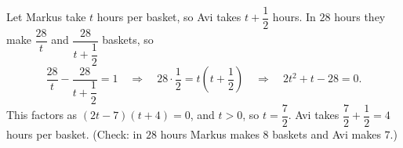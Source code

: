 Let Markus take $t$ hours per basket, so Avi takes $t+\dfrac{1}{2}$ hours. In $28$ hours they make $\dfrac{28}{t}$ and $\dfrac{28}{t+\dfrac{1}{2}}$ baskets, so
\[
\dfrac{28}{t}-\dfrac{28}{t+\dfrac{1}{2}}=1\quad\Longrightarrow\quad 28\cdot\dfrac{1}{2}=t\left(t+\dfrac{1}{2}\right)\quad\Longrightarrow\quad 2t^2+t-28=0 .
\]
This factors as $(2t-7)(t+4)=0$, and $t>0$, so $t=\dfrac{7}{2}$. Avi takes $\dfrac{7}{2}+\dfrac{1}{2}=\boxed{4}$ hours per basket. (Check: in $28$ hours Markus makes $8$ baskets and Avi makes $7$.)
